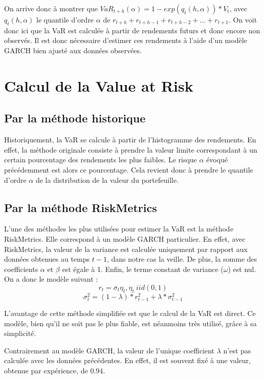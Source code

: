 			On arrive donc à montrer que $VaR_{t+h}(\alpha) = 1 - exp{(q_{t}(h,\alpha))}*V_{t}$, avec $q_{t}(h,\alpha)$ le quantile d'ordre $\alpha$ de $r_{t+h}+r_{t+h-1}+r_{t+h-2}+...+r_{t+1}$. On voit donc ici que la VaR est calculée à partir de rendements futurs et donc encore non observés. Il est donc nécessaire d'estimer ces rendements à l'aide d'un modèle GARCH bien ajusté aux données observées.
	
	\section{Calcul de la Value at Risk}

		\subsection{Par la méthode historique}
		\label{subsubsection:methode-historique}
			Historiquement, la VaR se calcule à partir de l'histogramme des rendements. En effet, la méthode originale consiste à prendre la valeur limite correspondant à un certain pourcentage des rendements les plus faibles. Le risque $\alpha$ évoqué précédemment est alors ce pourcentage. Cela revient donc à prendre le quantile d'ordre $\alpha$ de la distribution de la valeur du portefeuille.


		\subsection{Par la méthode RiskMetrics}
		\label{subsubsection:methode-riskmetrics}
			L'une des méthodes les plus utilisées pour estimer la VaR est la méthode RiskMetrics. Elle correspond à un modèle GARCH particulier. En effet, avec RiskMetrics, la valeur de la variance est calculée uniquement par rapport aux données obtenues au temps $t-1$, dans notre cas la veille. De plus, la somme des coefficients $\alpha$ et $\beta$ est égale à 1. Enfin, le terme constant de variance ($\omega$) est nul. On a donc le modèle suivant :
			\[r_t = \sigma_t\eta_t , \eta_t~iid(0,1)\]
			\[\sigma_t^2 = (1-\lambda)*r_{t-1}^2+\lambda*\sigma_{t-1}^2\]

			L'avantage de cette méthode simplifiée est que le calcul de la VaR est direct. Ce modèle, bien qu'il ne soit pas le plus fiable, est néanmoins très utilisé, grâce à sa simplicité.

			Contrairement au modèle GARCH, la valeur de l'unique coefficient $\lambda$ n'est pas calculée avec les données précédentes. En effet, il est souvent fixé à une valeur, obtenue par expérience, de $0.94$.


